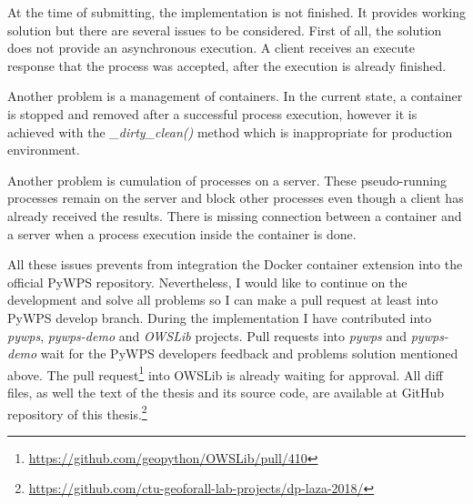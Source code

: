 \newpage
At the time of submitting, the implementation is not finished. It
provides working solution but there are several issues to be
considered. First of all, the solution does not provide an
asynchronous execution. A client receives an execute response that the
process was accepted, after the execution is already finished.

Another problem is a management of containers. In the current state, a
container is stopped and removed after a successful process execution,
however it is achieved with the \textit{\_dirty\_clean()} method which
is inappropriate for production environment.

Another problem is cumulation of processes on a server. These
pseudo-running processes remain on the server and block other
processes even though a client has already received the results. There
is missing connection between a container and a server when a process
execution inside the container is done.

All these issues prevents from integration the Docker container
extension into the official PyWPS repository.  Nevertheless, I would
like to continue on the development and solve all problems so I can
make a pull request at least into PyWPS develop branch. During the
implementation I have contributed into \textit{pywps}, \textit{pywps-demo}
and \textit{OWSLib} projects. Pull requests
into \textit{pywps} and \textit{pywps-demo} wait for the PyWPS
developers feedback and problems solution mentioned above. The pull
request\footnote{\url{https://github.com/geopython/OWSLib/pull/410}} into OWSLib is already waiting for approval. All diff files,
as well the text of the thesis and its source code,
are available at GitHub repository of this 
thesis.\footnote{\url{https://github.com/ctu-geoforall-lab-projects/dp-laza-2018/}}
